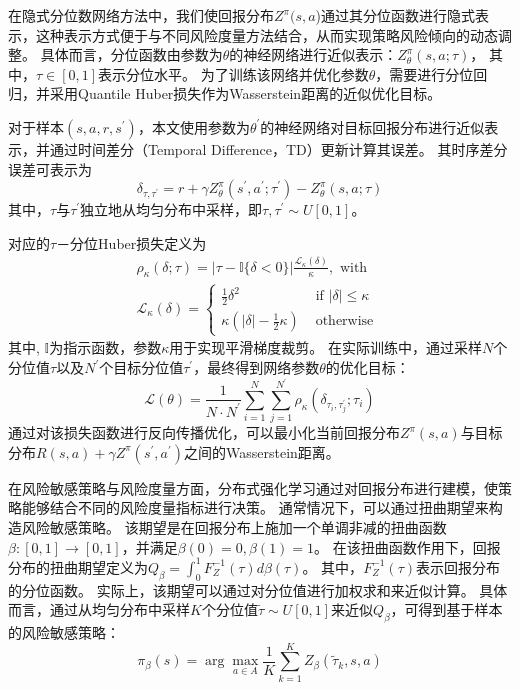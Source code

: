 在隐式分位数网络\cite{mokhtari2018iqn}方法中，我们使回报分布$Z^{\pi}(s, a$)通过其分位函数进行隐式表示，这种表示方式便于与不同风险度量方法结合，从而实现策略风险倾向的动态调整。
具体而言，分位函数由参数为$\theta$的神经网络进行近似表示：$Z_{\theta}^{\pi}(s, a ; \tau)$，
其中，$\tau \in[0,1]$表示分位水平。
为了训练该网络并优化参数$\theta$，需要进行分位回归\cite{buchinsky1998recent}，并采用Quantile Huber损失作为Wasserstein\cite{mokhtari2018iqn}距离的近似优化目标。

对于样本$\left(s, a, r, s^{\prime}\right)$，本文使用参数为$\theta^{\prime}$的神经网络对目标回报分布进行近似表示，并通过时间差分（Temporal Difference，TD）更新计算其误差。
其时序差分误差可表示为
\begin{equation}
\delta_{\tau, \tau^{\prime}}=r+\gamma Z_{\theta}^{\pi}\left(s^{\prime}, a^{\prime} ; \tau^{\prime}\right)-Z_{\theta}^{\pi}(s, a ; \tau)
\end{equation}
其中，$\tau$与$\tau^{\prime}$独立地从均匀分布中采样，即$\tau, \tau^{\prime} \sim U[0,1]$。

对应的$\tau$－分位Huber损失定义为
\begin{equation}
\begin{array}{l}
\rho_{\kappa}(\delta ; \tau)=|\tau-\mathbb{I}\{\delta<0\}| \frac{\mathcal{L}_{\kappa}(\delta)}{\kappa}, \text { with } \\
\mathcal{L}_{\kappa}(\delta)=\left\{\begin{array}{ll}
\frac{1}{2} \delta^{2} & \text { if }|\delta| \leq \kappa \\
\kappa\left(|\delta|-\frac{1}{2} \kappa\right) & \text { otherwise }
\end{array}\right.
\end{array}
\label{equ:Huber}
\end{equation}
其中, $\mathbb{I}$为指示函数，参数$\kappa$用于实现平滑梯度裁剪。
在实际训练中，通过采样$N$个分位值$\tau$以及$N^{\prime}$个目标分位值$\tau^{\prime}$，最终得到网络参数$\theta$的优化目标：
\begin{equation}
\mathcal{L}(\theta)=\frac{1}{N \cdot N^{\prime}} \sum_{i=1}^{N} \sum_{j=1}^{N^{\prime}} \rho_{\kappa}\left(\delta_{\tau_{i}, \tau_{j}^{\prime}} ; \tau_{i}\right)
\label{equ:lossfunction}
\end{equation}
通过对该损失函数进行反向传播优化，可以最小化当前回报分布$Z^{\pi}(s, a)$与目标分布$R(s, a)+\gamma Z^{\pi}\left(s^{\prime}, a^{\prime}\right)$之间的Wasserstein距离。

在风险敏感策略与风险度量方面，分布式强化学习通过对回报分布进行建模，使策略能够结合不同的风险度量指标进行决策。
通常情况下，可以通过扭曲期望来构造风险敏感策略。
该期望是在回报分布上施加一个单调非减的扭曲函数$\beta:[0,1] \rightarrow[0,1]$，并满足$\beta(0)=0, \beta(1)=1$。
在该扭曲函数作用下，回报分布的扭曲期望定义为$Q_{\beta}=\int_{0}^{1} F_{Z}^{-1}(\tau) d \beta(\tau)$。
其中，$F_{Z}^{-1}(\tau)$表示回报分布的分位函数。
实际上，该期望可以通过对分位值进行加权求和来近似计算。
具体而言，通过从均匀分布中采样$K$个分位值$\tilde{\tau}\sim U[0,1]$来近似$Q_{\beta}$，可得到基于样本的风险敏感策略：
\begin{equation}
\pi_{\beta}(s)=\arg \max _{a \in A} \frac{1}{K} \sum_{k=1}^{K} Z_{\beta}\left(\tilde{\tau}_{k}, s, a\right)
\end{equation}

